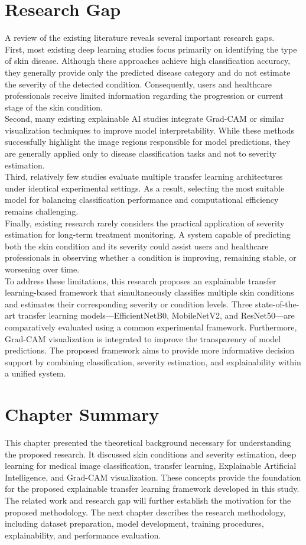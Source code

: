 \section{Research Gap}
A review of the existing literature reveals several important research gaps.\\
First, most existing deep learning studies focus primarily on identifying the type of skin disease. Although these approaches achieve high classification accuracy, they generally provide only the predicted disease category and do not estimate the severity of the detected condition. Consequently, users and healthcare professionals receive limited information regarding the progression or current stage of the skin condition.\\
Second, many existing explainable AI studies integrate Grad-CAM or similar visualization techniques to improve model interpretability. While these methods successfully highlight the image regions responsible for model predictions, they are generally applied only to disease classification tasks and not to severity estimation.\\
Third, relatively few studies evaluate multiple transfer learning architectures under identical experimental settings. As a result, selecting the most suitable model for balancing classification performance and computational efficiency remains challenging.\\
Finally, existing research rarely considers the practical application of severity estimation for long-term treatment monitoring. A system capable of predicting both the skin condition and its severity could assist users and healthcare professionals in observing whether a condition is improving, remaining stable, or worsening over time.\\
To address these limitations, this research proposes an explainable transfer learning-based framework that simultaneously classifies multiple skin conditions and estimates their corresponding severity or condition levels. Three state-of-the-art transfer learning models—EfficientNetB0, MobileNetV2, and ResNet50—are comparatively evaluated using a common experimental framework. Furthermore, Grad-CAM visualization is integrated to improve the transparency of model predictions. The proposed framework aims to provide more informative decision support by combining classification, severity estimation, and explainability within a unified system.

\section{Chapter Summary}
This chapter presented the theoretical background necessary for understanding the proposed research. It discussed skin conditions and severity estimation, deep learning for medical image classification, transfer learning, Explainable Artificial Intelligence, and Grad-CAM visualization. These concepts provide the foundation for the proposed explainable transfer learning framework developed in this study. The related work and research gap will further establish the motivation for the proposed methodology. The next chapter describes the research methodology, including dataset preparation, model development, training procedures, explainability, and performance evaluation.
